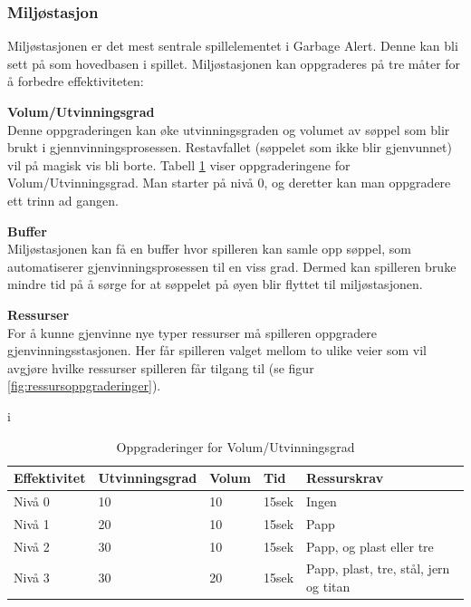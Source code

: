 \subsubsection{Miljøstasjon} \label{miljostasjon}
Miljøstasjonen er det mest sentrale spillelementet i Garbage
Alert. Denne kan bli sett på som hovedbasen i spillet.
Miljøstasjonen kan oppgraderes på tre måter for å forbedre effektiviteten:\\
\begin{description}
	\item \textbf{Volum/Utvinningsgrad}\\Denne oppgraderingen kan øke
utvinningsgraden og volumet av søppel som blir brukt i
gjennvinningsprosessen. Restavfallet (søppelet som ikke blir gjenvunnet)
vil på magisk vis bli borte. Tabell \ref{tab:effektivitet} viser
oppgraderingene for Volum/Utvinningsgrad. Man starter på nivå 0, og
deretter kan man oppgradere ett trinn ad gangen.
	\item \textbf{Buffer}\\Miljøstasjonen kan få en buffer hvor spilleren kan samle opp søppel, som automatiserer gjenvinningsprosessen til en viss grad. Dermed kan spilleren bruke mindre tid på å sørge for at søppelet på øyen blir flyttet til miljøstasjonen.
	\item \textbf{Ressurser}\\For å kunne gjenvinne nye typer ressurser må
		spilleren oppgradere gjenvinningsstasjonen. Her får spilleren valget
		mellom to ulike veier som vil avgjøre hvilke ressurser spilleren får
		tilgang til (se figur \ref{fig:ressursoppgraderinger}).
\end{description}

\begin{table} i
\begin{tabular}[\textwidth]{ l  l  p{3cm}  l  p{4cm} } %
\hline
\bf{Effektivitet} & \bf{Utvinningsgrad} & \bf{Volum} & \bf{Tid} & \bf{Ressurskrav} \\
\hline
Nivå 0 & 10 & 10 & 15sek & Ingen  \\
Nivå 1 & 20 & 10 & 15sek & Papp \\
Nivå 2 & 30 & 10 & 15sek & Papp, og plast eller tre \\
Nivå 3 & 30 & 20 & 15sek & Papp, plast, tre, stål, jern og titan \\
\hline
\end{tabular}
\caption{Oppgraderinger for Volum/Utvinningsgrad}
\label{tab:effektivitet}
\end{table}


